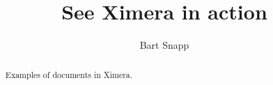 \documentclass{ximera}
\title{See Ximera in action}
\author{Bart Snapp}
\begin{document}
\begin{abstract}
Examples of documents in Ximera.
\end{abstract}
\maketitle
\end{document}
